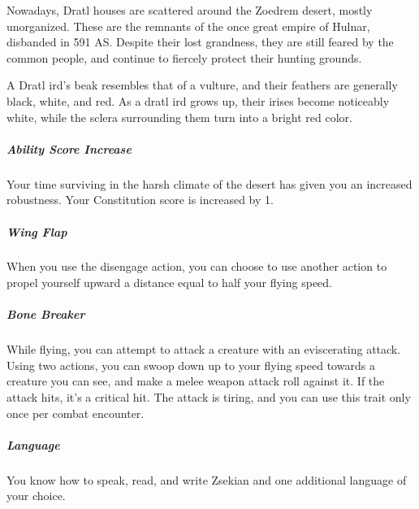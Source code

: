     Nowadays, Dratl houses are scattered around the Zoedrem desert, mostly unorganized.
    These are the remnants of the once great empire of Hulnar, disbanded in 591 AS.
    Despite their lost grandness, they are still feared by the common people, and continue to fiercely protect their hunting grounds.

    A Dratl ird's beak resembles that of a vulture, and their feathers are generally black, white, and red.
    As a dratl ird grows up, their irises become noticeably white, while the sclera surrounding them turn into a bright red color.

    \subparagraph{Ability Score Increase} Your time surviving in the harsh climate of the desert has given you an increased robustness.
    Your Constitution score is increased by 1.

    \subparagraph{Wing Flap} When you use the disengage action, you can choose to use another action to propel yourself upward a distance equal to half your flying speed.

    \subparagraph{Bone Breaker} While flying, you can attempt to attack a creature with an eviscerating attack.
    Using two actions, you can swoop down up to your flying speed towards a creature you can see, and make a melee weapon attack roll against it.
    If the attack hits, it's a critical hit.
    The attack is tiring, and you can use this trait only once per combat encounter.

    \subparagraph{Language} You know how to speak, read, and write Zsekian and one additional language of your choice.


\newpage

